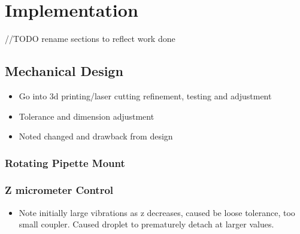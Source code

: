 \chapter{Implementation}\label{C:imp}


//TODO rename sections to reflect work done
\section{Mechanical Design}

\begin{itemize}
    \item Go into 3d printing/laser cutting refinement, testing and adjustment
    \item Tolerance and dimension adjustment
    \item Noted changed and drawback from design
\end{itemize}

\subsection{Rotating Pipette Mount}

\subsection{Z micrometer Control}
\begin{itemize}
    \item Note initially large vibrations as z decreases, caused be loose tolerance, too small coupler. Caused droplet to prematurely detach at larger values.
\end{itemize}


